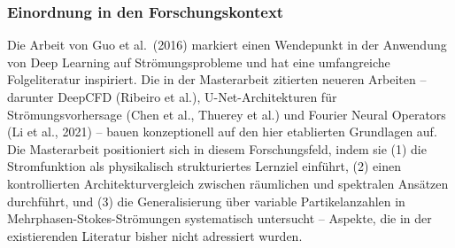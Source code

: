 \documentclass[a4paper,12pt]{article}
\begin{document}
\subsubsection*{Einordnung in den Forschungskontext}

Die Arbeit von Guo et al.\ (2016) markiert einen Wendepunkt in der Anwendung von Deep Learning auf Strömungsprobleme und hat eine umfangreiche Folgeliteratur inspiriert. Die in der Masterarbeit zitierten neueren Arbeiten -- darunter DeepCFD (Ribeiro et al.), U-Net-Architekturen für Strömungsvorhersage (Chen et al., Thuerey et al.) und Fourier Neural Operators (Li et al., 2021) -- bauen konzeptionell auf den hier etablierten Grundlagen auf. Die Masterarbeit positioniert sich in diesem Forschungsfeld, indem sie (1) die Stromfunktion als physikalisch strukturiertes Lernziel einführt, (2) einen kontrollierten Architekturvergleich zwischen räumlichen und spektralen Ansätzen durchführt, und (3) die Generalisierung über variable Partikelanzahlen in Mehrphasen-Stokes-Strömungen systematisch untersucht -- Aspekte, die in der existierenden Literatur bisher nicht adressiert wurden.
\end{document}

